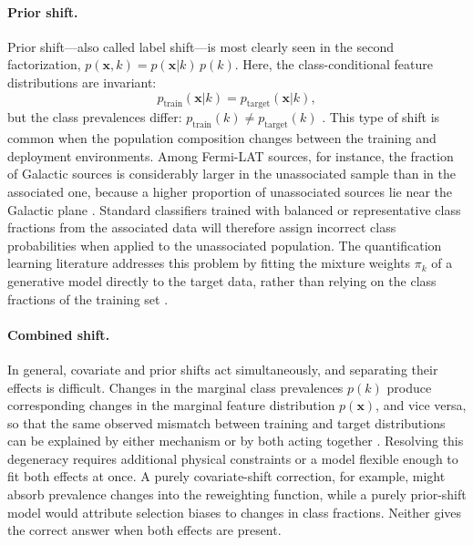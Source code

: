 \paragraph{Prior shift.}

Prior shift---also called label shift---is most clearly seen in the second factorization, $p(\mathbf{x}, k) = p(\mathbf{x}|k)\,p(k)$.
Here, the class-conditional feature distributions are invariant:
\begin{equation}
	p_{\text{train}}(\mathbf{x}|k) = p_{\text{target}}(\mathbf{x}|k),
	\label{eq:prior_shift}
\end{equation}
but the class prevalences differ: $p_{\text{train}}(k) \neq p_{\text{target}}(k)$ \cite{MorenoTorres2012AUV}.
This type of shift is common when the population composition changes between the training and deployment environments.
Among Fermi-LAT sources, for instance, the fraction of Galactic sources is considerably larger in the unassociated sample than in the associated one, because a higher proportion of unassociated sources lie near the Galactic plane \cite{2023RASTI...2..735M}.
Standard classifiers trained with balanced or representative class fractions from the associated data will therefore assign incorrect class probabilities when applied to the unassociated population.
The quantification learning literature \cite{10.1145/3117807_Gonzalez_quantification} addresses this problem by fitting the mixture weights $\pi_k$ of a generative model directly to the target data, rather than relying on the class fractions of the training set \cite{10.1162/089976602753284446_Saerens,2024arXiv240100490M}.

\paragraph{Combined shift.}

In general, covariate and prior shifts act simultaneously, and separating their effects is difficult.
Changes in the marginal class prevalences $p(k)$ produce corresponding changes in the marginal feature distribution $p(\mathbf{x})$, and vice versa, so that the same observed mismatch between training and target distributions can be explained by either mechanism or by both acting together \cite{MorenoTorres2012AUV}.
Resolving this degeneracy requires additional physical constraints or a model flexible enough to fit both effects at once.
A purely covariate-shift correction, for example, might absorb prevalence changes into the reweighting function, while a purely prior-shift model would attribute selection biases to changes in class fractions.
Neither gives the correct answer when both effects are present.

